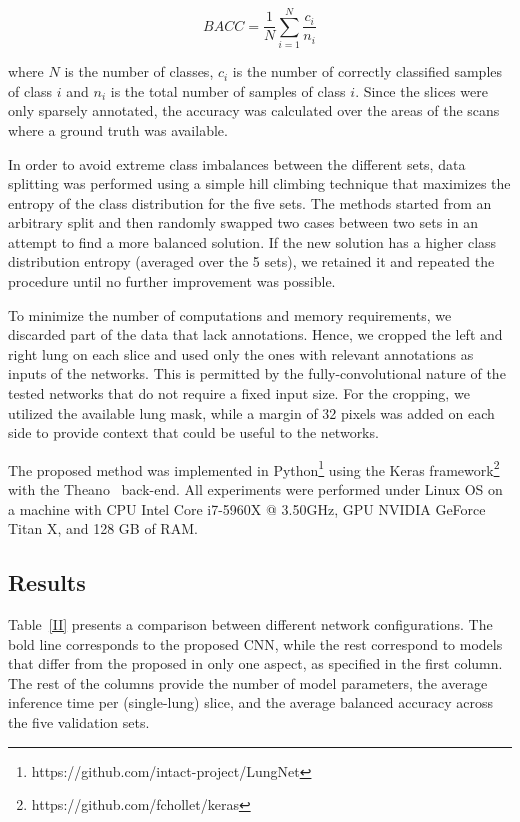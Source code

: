 \documentclass[journal]{IEEEtran}
\begin{document}
\begin{equation}\label{eq:1}
BACC = \frac{1}{N}\sum_{i=1}^{N}\frac{c_i}{n_i}
\end{equation}

where $N$ is the number of classes, $c_i$ is the number of correctly classified samples of class $i$ and $n_i$ is the total number of samples of class $i$. Since the slices were only sparsely annotated, the accuracy was calculated over the areas of the scans where a ground truth was available. 

In order to avoid extreme class imbalances between the different sets, data splitting was performed using a simple hill climbing technique that maximizes the entropy of the class distribution for the five sets. The methods started from an arbitrary split and then randomly swapped two cases between two sets in an attempt to find a more balanced solution. If the new solution has a higher class distribution entropy (averaged over the 5 sets), we retained it and repeated the procedure until no further improvement was possible.

To minimize the number of computations and memory requirements, we discarded part of the data that lack annotations. Hence, we cropped the left and right lung on each slice and used only the ones with relevant annotations as inputs of the networks. This is permitted by the fully-convolutional nature of the tested networks that do not require a fixed input size. For the cropping, we utilized the available lung mask, while a margin of 32 pixels was added on each side to provide context that could be useful to the networks. 

The proposed method was implemented in Python\footnote{https://github.com/intact-project/LungNet} using the Keras framework\footnote{https://github.com/fchollet/keras} with the Theano~\cite{theano} back-end. All experiments were performed under Linux OS on a machine with CPU Intel Core i7-5960X @ 3.50GHz, GPU NVIDIA GeForce Titan X, and 128 GB of RAM.

\subsection{Results}
Table~\ref{II} presents a comparison between different network configurations. The bold line corresponds to the proposed CNN, while the rest correspond to models that differ from the proposed in only one aspect, as specified in the first column. The rest of the columns provide the number of model parameters, the average inference time per (single-lung) slice, and the average balanced accuracy across the five validation sets. 
\end{document}

